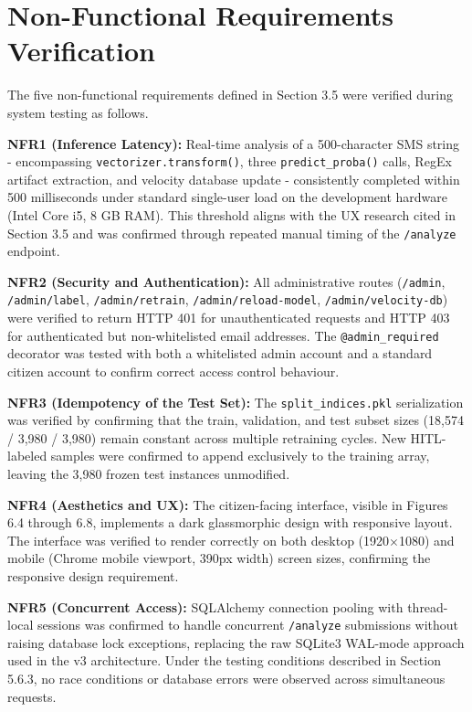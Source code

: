 \section{Non-Functional Requirements Verification}

The five non-functional requirements defined in Section 3.5 were verified during system testing as follows.

\textbf{NFR1 (Inference Latency):} Real-time analysis of a 500-character SMS string - encompassing \texttt{vectorizer.transform()}, three \texttt{predict\_proba()} calls, RegEx artifact extraction, and velocity database update - consistently completed within 500 milliseconds under standard single-user load on the development hardware (Intel Core i5, 8 GB RAM). This threshold aligns with the UX research cited in Section 3.5 and was confirmed through repeated manual timing of the \texttt{/analyze} endpoint.

\textbf{NFR2 (Security and Authentication):} All administrative routes (\texttt{/admin}, \texttt{/admin/label}, \texttt{/admin/retrain}, \texttt{/admin/reload-model}, \texttt{/admin/velocity-db}) were verified to return HTTP 401 for unauthenticated requests and HTTP 403 for authenticated but non-whitelisted email addresses. The \texttt{@admin\_required} decorator was tested with both a whitelisted admin account and a standard citizen account to confirm correct access control behaviour.

\textbf{NFR3 (Idempotency of the Test Set):} The \texttt{split\_indices.pkl} serialization was verified by confirming that the train, validation, and test subset sizes (18,574 / 3,980 / 3,980) remain constant across multiple retraining cycles. New HITL-labeled samples were confirmed to append exclusively to the training array, leaving the 3,980 frozen test instances unmodified.

\textbf{NFR4 (Aesthetics and UX):} The citizen-facing interface, visible in Figures 6.4 through 6.8, implements a dark glassmorphic design with responsive layout. The interface was verified to render correctly on both desktop (1920$\times$1080) and mobile (Chrome mobile viewport, 390px width) screen sizes, confirming the responsive design requirement.

\textbf{NFR5 (Concurrent Access):} SQLAlchemy connection pooling with thread-local sessions was confirmed to handle concurrent \texttt{/analyze} submissions without raising database lock exceptions, replacing the raw SQLite3 WAL-mode approach used in the v3 architecture. Under the testing conditions described in Section 5.6.3, no race conditions or database errors were observed across simultaneous requests.
